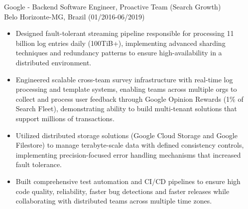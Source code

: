 
\normalsize{Google - Backend Software Engineer, Proactive Team (Search Growth)}\\
        \scriptsize{Belo Horizonte-MG, Brazil (01/2016-06/2019)}
\begin{itemize}
    \item \scriptsize{Designed fault-tolerant streaming pipeline responsible for processing 11 billion 
        log entries daily (100TiB+), implementing advanced sharding techniques and redundancy patterns to ensure high-availability in a distributed environment.}

    \item \scriptsize{Engineered scalable cross-team survey infrastructure with real-time log processing 
        and template systems, enabling teams across multiple orgs to collect and process user feedback 
        through Google Opinion Rewards (1\% of Search Fleet), demonstrating ability to build 
        multi-tenant solutions that support millions of transactions.}
    
    \item \scriptsize{Utilized distributed storage solutions (Google Cloud Storage and Google Filestore)
        to manage terabyte-scale data with defined consistency controls, implementing precision-focused 
        error handling mechanisms that increased fault tolerance.}

    \item \scriptsize{Built comprehensive test automation and CI/CD pipelines to ensure high code 
        quality, reliability, faster bug detections and faster releases while collaborating with
        distributed teams across multiple time zones.}
\end{itemize}